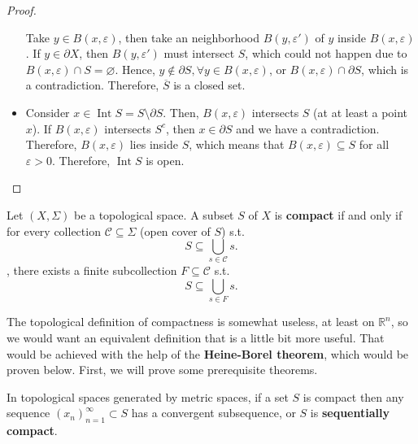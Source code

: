 \begin{proof}
\begin{itemize}
    Take \( y \in B(x, \varepsilon) \), then take an neighborhood \( B(y,
    \varepsilon') \) of \( y \) inside \( B(x, \varepsilon) \). If \( y \in \partial
    X\), then \( B(y, \varepsilon') \) must intersect \( S \), which could not
    happen due to \( B(x, \varepsilon) \cap  S = \varnothing \). Hence, \( y
    \notin \partial S, \forall y \in B(x, \varepsilon) \), or \( B(x,
    \varepsilon) \cap  \partial S \), which is a contradiction. Therefore, \(
    \overline{S} \) is a closed set.

  \item Consider \( x \in \operatorname{Int} S = S \setminus \partial S \).
    Then, \( B(x, \varepsilon) \) intersects \( S \) (at at least a point \( x
    \)). If \( B(x, \varepsilon) \) intersects \( S^{c} \), then \( x \in
    \partial S \) and we have a contradiction. Therefore, \( B(x, \varepsilon)
    \) lies inside \( S \), which means that \( B(x, \varepsilon) \subseteq S \)
    for all \( \varepsilon > 0 \). Therefore, \( \operatorname{Int} S \) is
    open.
\end{itemize}
\end{proof}

\begin{definition}
  Let \( (X, \Sigma) \) be a topological space. A subset \( S \) of \( X \) is
  \textbf{compact} if and only if for every collection \( \mathcal{C} \subseteq
  \Sigma \) (open cover of \( S \)) s.t.\[
    S \subseteq  \bigcup_{s \in \mathcal{C}} s
  .\] , there exists a finite subcollection \( F
  \subseteq \mathcal{C} \) s.t. \[
    S \subseteq  \bigcup_{s \in F} s
  .\] 
\end{definition}

The topological definition of compactness is somewhat useless, at least on \(
\mathbb{R}^{n} \), so we would want an equivalent definition that is a little
bit more useful. That would be achieved with the help of the \textbf{Heine-Borel
theorem}, which would be proven below. First, we will prove some prerequisite
theorems.

\begin{theorem}
  In topological spaces generated by metric spaces, if a set \( S \) is compact
  then any sequence \( (x_n)_{n=1}^{\infty} \subset S \) has a convergent
  subsequence, or \( S \) is \textbf{sequentially compact}.
\end{theorem}

